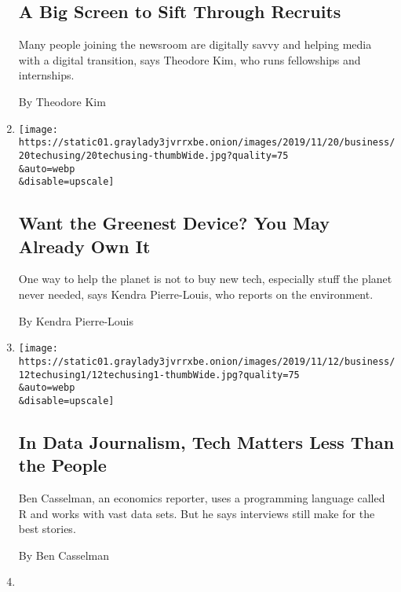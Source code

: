 \begin{enumerate}
{  \subsection{A Big Screen to Sift Through
  Recruits}\label{a-big-screen-to-sift-through-recruits}}

  Many people joining the newsroom are digitally savvy and helping media
  with a digital transition, says Theodore Kim, who runs fellowships and
  internships.

  By Theodore Kim
\item
  \href{/2019/11/20/technology/personaltech/green-environmental-tech.html}{}

  \texttt{[image: https://static01.graylady3jvrrxbe.onion/images/2019/11/20/business/20techusing/20techusing-thumbWide.jpg?quality=75\\\&auto=webp\\\&disable=upscale]}

  \hypertarget{want-the-greenest-device-you-may-already-own-it}{%
  \subsection{Want the Greenest Device? You May Already Own
  It}\label{want-the-greenest-device-you-may-already-own-it}}

  One way to help the planet is not to buy new tech, especially stuff
  the planet never needed, says Kendra Pierre-Louis, who reports on the
  environment.

  By Kendra Pierre-Louis
\item
  \href{/2019/11/13/technology/personaltech/data-journalism-economics.html}{}

  \texttt{[image: https://static01.graylady3jvrrxbe.onion/images/2019/11/12/business/12techusing1/12techusing1-thumbWide.jpg?quality=75\\\&auto=webp\\\&disable=upscale]}

  \hypertarget{in-data-journalism-tech-matters-less-than-the-people}{%
  \subsection{In Data Journalism, Tech Matters Less Than the
  People}\label{in-data-journalism-tech-matters-less-than-the-people}}

  Ben Casselman, an economics reporter, uses a programming language
  called R and works with vast data sets. But he says interviews still
  make for the best stories.

  By Ben Casselman
\item
  \href{/2019/11/06/technology/personaltech/techs-environmental-impact-and-what-you-can-do-about-it.html}{}


\end{enumerate}

